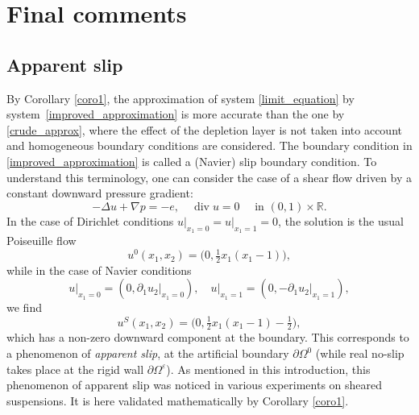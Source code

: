 \documentclass[10pt]{amsart}
\renewcommand{\div}{\operatorname{div}}
\theoremstyle{plain}
\theoremstyle{definition}
\let\pa\partial
\let\na\nabla
\let\eps\varepsilon
\newcommand{\R}{\mathbb{R}}
\begin{document}
\section{Final comments} \label{sec_final_comments}

\subsection{Apparent slip} \label{subsec_apparent}
By Corollary \ref{coro1}, the approximation of system \eqref{limit_equation} by system~\eqref{improved_approximation} is more accurate than the one by \eqref{crude_approx}, where the effect of the depletion layer is not taken into account and homogeneous boundary conditions are considered. The boundary condition in \eqref{improved_approximation} is called a (Navier) slip boundary condition. To understand this terminology, one can consider the case of a shear flow driven by a constant downward pressure gradient:
\[
- \Delta u + \na p = - e, \quad \div u = 0 \quad \text{ in } (0,1) \times \R.
\]
In the case of Dirichlet conditions $u\vert_{x_1=0} = u\vert_{x_1=1} = 0$, the solution is the usual Poiseuille flow
\[
u^0(x_1,x_2) = \big(0, \tfrac{1}{2} x_1 (x_1-1)\big),
\]
while in the case of Navier conditions
\[
u\vert_{x_1=0} = (0, \pa_1 u_2\vert_{x_1=0}), \quad u\vert_{x_1=1} = (0, -\pa_1 u_2\vert_{x_1=1}),
\]
we find
\[
u^S(x_1,x_2) = \big(0,\tfrac{1}{2} x_1 (x_1-1) - \tfrac12\big),
\]
which has a non-zero downward component at the boundary. This corresponds to a phenomenon of {\em apparent slip}, at the artificial boundary $\pa \Omega^0$ (while real no-slip takes place at the rigid wall $\pa \Omega^\eps$). As mentioned in this introduction, this phenomenon of apparent slip was noticed in various experiments on sheared suspensions. It is here validated mathematically by Corollary \ref{coro1}.
\end{document}
